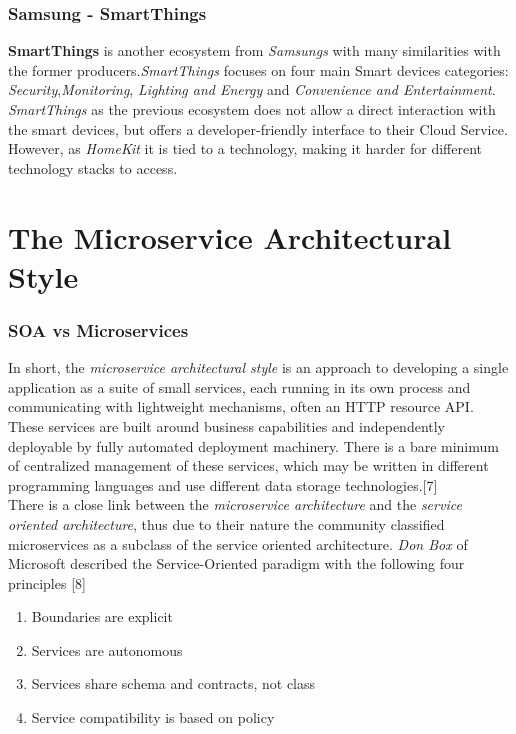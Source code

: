 \subsubsection{Samsung - SmartThings}

\textbf{SmartThings} is another ecosystem from \textit{Samsungs} with many similarities
with the former producers.\textit{SmartThings} focuses on four main Smart devices categories:
\textit{Security},\textit{Monitoring}, \textit{Lighting and Energy} and \textit{Convenience and Entertainment}.
\textit{SmartThings} as the previous ecosystem does not allow a direct interaction with the smart devices,
but offers a developer-friendly interface to their Cloud Service. However, as \textit{HomeKit} it is tied to
a technology, making it harder for different technology stacks to access.


\section{The Microservice Architectural Style}

\subsubsection{SOA vs Microservices}
In short, the \textit{microservice architectural style} is an approach to developing a single
application as a suite of small services, each running in its own process and communicating with
lightweight mechanisms, often an HTTP resource API. These services are built around business capabilities
and independently deployable by fully automated deployment machinery. There is
a bare minimum of centralized management of these services,
which may be written in different programming languages and use different data storage technologies.[7]\\
There is a close link between the \textit{microservice architecture} and the \textit{service oriented architecture},
thus due to their nature the community classified microservices as a subclass of the service oriented architecture.
\textit{Don Box} of Microsoft described the Service-Oriented paradigm with the following four principles [8]

\begin{enumerate}
  \item Boundaries are explicit
  \item Services are autonomous
  \item Services share schema and contracts, not class
  \item Service compatibility is based on policy
\end{enumerate}

